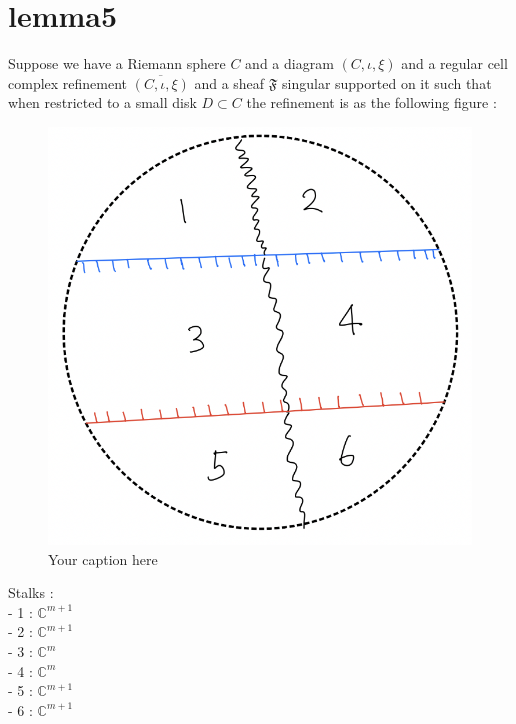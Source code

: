\section{lemma5}
\begin{lemma}
\end{lemma}
Suppose we have a Riemann sphere $C$ and a diagram $(C,\iota,\xi)$ and a regular cell complex refinement $\overline{(C,\iota,\xi)}$ and a sheaf $\mathfrak{F}$ singular supported on it such that when restricted to a small disk $D\subset C$ the refinement is as the following figure :

\begin{figure}[H] %
    \centering
    \includegraphics[width=\linewidth]{diagrams/lemma5/1.png} %
    \caption{Your caption here}
    \label{fig:your-label}
\end{figure}

Stalks :\\

- 1 : $\mathbb{C}^{m+1}$\\
- 2 : $\mathbb{C}^{m+1}$\\
- 3 : $\mathbb{C}^{m}$\\
- 4 : $\mathbb{C}^{m}$\\
- 5 : $\mathbb{C}^{m+1}$\\
- 6 : $\mathbb{C}^{m+1}$\\



